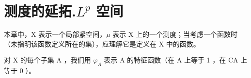 \chapter{\texorpdfstring{测度的延拓.\(L^{p}\) 空间}{测度的延拓.L to the p 空间}}

本章中，X 表示一个局部紧空间，\(\mu\) 表示 X 上的一个测度；当考虑一个函数时（未指明该函数定义所在的集），应理解它是定义在 X 中的函数。

对 X 的每个子集 A ，我们用 \(\varphi_{A}\) 表示 A 的特征函数（在 A 上等于 1 ，在 CA 上等于 0 ）。

